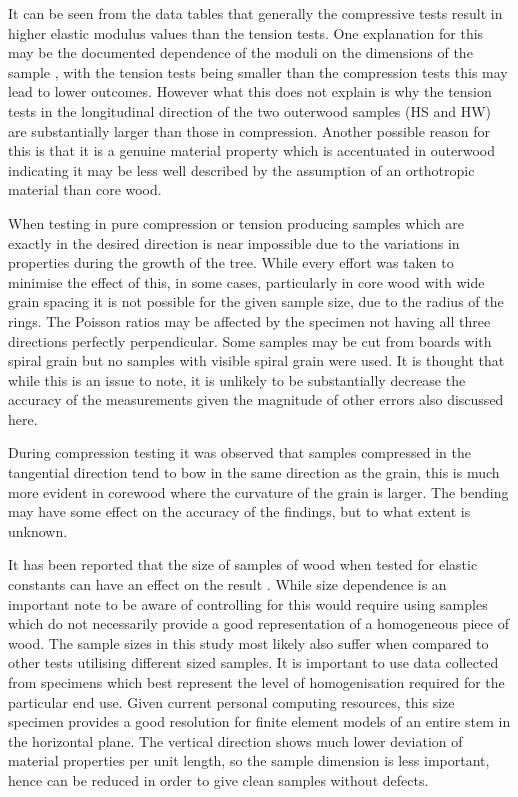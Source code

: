 \documentclass[10pt]{article}
\begin{document}
It can be seen from the data tables that generally the compressive tests result in higher elastic modulus values than the tension tests. One explanation for this may be the documented dependence of the moduli on the dimensions of the sample \citep{niklas_mechanical_1997}, with the tension tests being smaller than the compression tests this may lead to lower outcomes. However what this does not explain is why the tension tests in the longitudinal direction of the two outerwood samples (HS and HW) are substantially larger than those in compression. Another possible reason for this is that it is a genuine material property which is accentuated in outerwood indicating it may be less well described by the assumption of an orthotropic material than core wood.

When testing in pure compression or tension producing samples which are exactly in the desired direction is near impossible due to the variations in properties during the growth of the tree. While every effort was taken to minimise the effect of this, in some cases, particularly in core wood with wide grain spacing it is not possible for the given sample size, due to the radius of the rings. The Poisson ratios may be affected by the specimen not having all three directions perfectly perpendicular. Some samples may be cut from boards with spiral grain but no samples with visible spiral grain were used. It is thought that while this is an issue to note, it is unlikely to be substantially decrease the accuracy of the measurements given the magnitude of other errors also discussed here.

During compression testing it was observed that samples compressed in the tangential direction tend to bow in the same direction as the grain, this is much more evident in corewood where the curvature of the grain is larger. The bending may have some effect on the accuracy of the findings, but to what extent is unknown.

It has been reported that the size of samples of wood when tested for elastic constants can have an effect on the result \citep{niklas_mechanical_1997}. While size dependence is an important note to be aware of controlling for this would require using samples which do not necessarily provide a good representation of a homogeneous piece of wood. The sample sizes in this study most likely also suffer when compared to other tests utilising different sized samples. It is important to use data collected from specimens which best represent the level of homogenisation required for the particular end use. Given current personal computing resources, this size specimen provides a good resolution for finite element models of an entire stem in the horizontal plane. The vertical direction shows much lower deviation of material properties per unit length, so the sample dimension is less important, hence can be reduced in order to give clean samples without defects.
\end{document}
